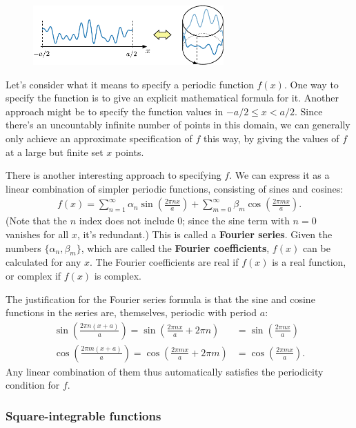 \documentclass[10pt,a4paper]{article}
\begin{document}
\begin{figure}[ht]
  \centering\includegraphics[width=0.65\textwidth]{periodic_ring}
\end{figure}

Let's consider what it means to specify a periodic function
$f(x)$. One way to specify the function is to give an explicit
mathematical formula for it. Another approach might be to specify the
function values in $-a/2 \le x < a/2$. Since there's an uncountably
infinite number of points in this domain, we can generally only
achieve an approximate specification of $f$ this way, by giving the
values of $f$ at a large but finite set $x$ points.

There is another interesting approach to specifying $f$. We can
express it as a linear combination of simpler periodic functions,
consisting of sines and cosines:
\begin{align}
  f(x) = \sum_{n=1}^\infty \alpha_n \sin\left(\frac{2\pi n x}{a}\right) + \sum_{m=0}^\infty \beta_m \cos\left(\frac{2 \pi m x}{a}\right).
\end{align}
(Note that the $n$ index does not include 0; since the sine term with
$n = 0$ vanishes for all $x$, it's redundant.) This is called a
\textbf{Fourier series}. Given the numbers $\{\alpha_n, \beta_m\}$,
which are called the \textbf{Fourier coefficients}, $f(x)$ can be
calculated for any $x$. The Fourier coefficients are real if $f(x)$ is
a real function, or complex if $f(x)$ is complex.

The justification for the Fourier series formula is that the sine and
cosine functions in the series are, themselves, periodic with period
$a$:
\begin{align}
  \sin\left(\frac{2\pi n (x+a)}{a}\right) = \sin\left(\frac{2\pi n x}{a} + 2\pi n\right) &= \sin\left(\frac{2\pi n x}{a}\right)\\
  \cos\left(\frac{2\pi m (x+a)}{a}\right) = \cos\left(\frac{2\pi m x}{a} + 2\pi m\right) &= \cos\left(\frac{2\pi m x}{a}\right).
\end{align}
Any linear combination of them thus automatically satisfies the
periodicity condition for $f$.

\subsubsection{Square-integrable functions}
\label{square-integrable-functions}
\end{document}
